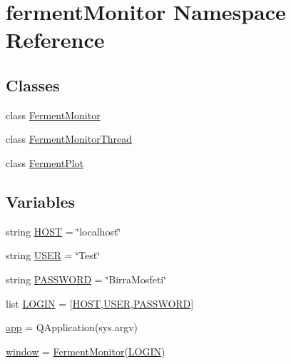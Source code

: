 \hypertarget{namespaceferment_monitor}{}\section{ferment\+Monitor Namespace Reference}
\label{namespaceferment_monitor}
\subsection*{Classes}
\begin{DoxyCompactItemize}
\item 
class \mbox{\hyperlink{classferment_monitor_1_1_ferment_monitor}{Ferment\+Monitor}}
\item 
class \mbox{\hyperlink{classferment_monitor_1_1_ferment_monitor_thread}{Ferment\+Monitor\+Thread}}
\item 
class \mbox{\hyperlink{classferment_monitor_1_1_ferment_plot}{Ferment\+Plot}}
\end{DoxyCompactItemize}
\subsection*{Variables}
\begin{DoxyCompactItemize}
\item 
string \mbox{\hyperlink{namespaceferment_monitor_aa797be38491f4fc55ab83583227d661f}{H\+O\+ST}} = \char`\"{}localhost\char`\"{}
\item 
string \mbox{\hyperlink{namespaceferment_monitor_aa3dfafc218979411b8a36d3c0b13169e}{U\+S\+ER}} = \char`\"{}Test\char`\"{}
\item 
string \mbox{\hyperlink{namespaceferment_monitor_a51f37fb775290bb08bddcd5565421263}{P\+A\+S\+S\+W\+O\+RD}} = \char`\"{}Birra\+Mosfeti\char`\"{}
\item 
list \mbox{\hyperlink{namespaceferment_monitor_ac0d7af2295b5bf29813e82d1152217c7}{L\+O\+G\+IN}} = \mbox{[}\mbox{\hyperlink{namespaceferment_monitor_aa797be38491f4fc55ab83583227d661f}{H\+O\+ST}},\mbox{\hyperlink{namespaceferment_monitor_aa3dfafc218979411b8a36d3c0b13169e}{U\+S\+ER}},\mbox{\hyperlink{namespaceferment_monitor_a51f37fb775290bb08bddcd5565421263}{P\+A\+S\+S\+W\+O\+RD}}\mbox{]}
\item 
\mbox{\hyperlink{namespaceferment_monitor_a2bb37bf747876f5619c602d8a6c952c2}{app}} = Q\+Application(sys.\+argv)
\item 
\mbox{\hyperlink{namespaceferment_monitor_a6b7141e329fcc7042c5ea9350eaa59b6}{window}} = \mbox{\hyperlink{classferment_monitor_1_1_ferment_monitor}{Ferment\+Monitor}}(\mbox{\hyperlink{namespaceferment_monitor_ac0d7af2295b5bf29813e82d1152217c7}{L\+O\+G\+IN}})
\end{DoxyCompactItemize}


